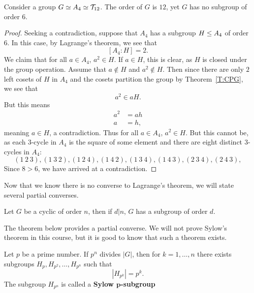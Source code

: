 \documentclass{ximera}
\begin{document}
\begin{example}
  Consider a group $G\simeq A_4\simeq \mathcal{T}_{12}$. The order of $G$
  is $12$, yet $G$ has no subgroup of order $6$.
  \begin{proof}
    Seeking a contradiction, suppose that $A_4$ has a subgroup
    $H\leq A_4$ of order $6$. In this case, by Lagrange's theorem, we
    see that
    \[
    [A_4:H] = 2.
    \]
    We claim that for all $a\in A_4$, $a^2\in H$. If $a\in H$, this is
    clear, as $H$ is closed under the group operation. Assume that
    $a\notin H$ and $a^2\notin H$. Then since there are only $2$ left
    cosets of $H$ in $A_4$ and the cosets partition the group by
    Theorem~\ref{T:CPG}, we see that
    \[
    a^2\in aH.
    \]
    But this means
    \begin{align*}
      a^2 &= ah\\
      a   &= h,
    \end{align*}
    meaning $a\in H$, a contradiction. Thus for all $a\in A_4$,
    $a^2\in H$. But this cannot be, as each $3$-cycle in $A_4$ is the
    square of some element and there are eight distinct $3$-cycles in
    $A_4$:
    \[
    (1\ 2\ 3), (1\ 3\ 2), (1\ 2\ 4), (1\ 4\ 2),
    (1\ 3\ 4), (1\ 4\ 3), (2\ 3\ 4), (2\ 4\ 3),
    \]
    Since $8>6$, we have arrived at a contradiction.
  \end{proof}
\end{example}

Now that we know there is no converse to Lagrange's theorem, we will
state several partial converses.


\begin{exercise}
  Let $G$ be a cyclic of order $n$, then if $d|n$, $G$ has a subgroup
  of order $d$.
\end{exercise}




The theorem below provides a partial converse. We will not prove
Sylow's theorem in this course, but it is good to know that such a
theorem exists.

\begin{theorem}
  Let $p$ be a prime number. If $p^n$ divides $|G|$, then for $k =
  1,\dots, n$ there exists subgroups $H_p, H_{p^2},\dots,H_{p^n}$ such
  that
  \[
  |H_{p^k}| = p^k.
  \]
  The subgroup $H_{p^n}$ is called a \textbf{Sylow
    $\boldsymbol{p}$-subgroup}
\end{theorem}
\end{document}

